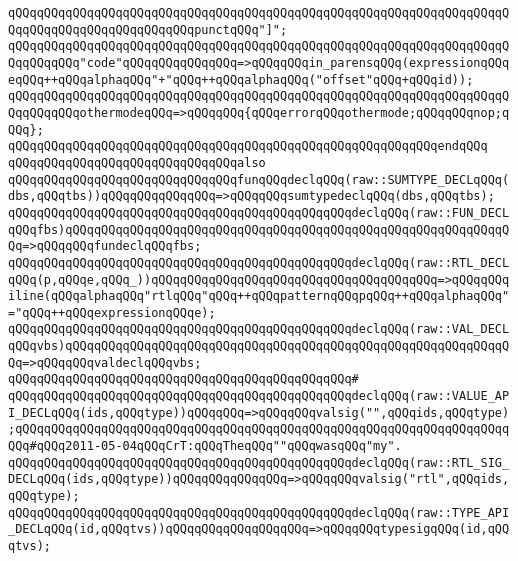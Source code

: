 \verb|qQQqqQQqqQQqqQQqqQQqqQQqqQQqqQQqqQQqqQQqqQQqqQQqqQQqqQQqqQQqqQQqqQQqqQQqqQQqqQQqqQQqqQQqqQQqqQQqpunctqQQq"]";|\newline
\newline
\verb|qQQqqQQqqQQqqQQqqQQqqQQqqQQqqQQqqQQqqQQqqQQqqQQqqQQqqQQqqQQqqQQqqQQqqQQqqQQqqQQq"code"qQQqqQQqqQQqqQQq=>qQQqqQQqin_parensqQQq(expressionqQQqeqQQq++qQQqalphaqQQq"+"qQQq++qQQqalphaqQQq("offset"qQQq+qQQqid));|\newline
\newline
\verb|qQQqqQQqqQQqqQQqqQQqqQQqqQQqqQQqqQQqqQQqqQQqqQQqqQQqqQQqqQQqqQQqqQQqqQQqqQQqqQQqothermodeqQQq=>qQQqqQQq{qQQqerrorqQQqothermode;qQQqqQQqnop;qQQq};|\newline
\verb|qQQqqQQqqQQqqQQqqQQqqQQqqQQqqQQqqQQqqQQqqQQqqQQqqQQqqQQqqQQqendqQQq|\newline
\newline
\verb|qQQqqQQqqQQqqQQqqQQqqQQqqQQqqQQqalso|\newline
\verb|qQQqqQQqqQQqqQQqqQQqqQQqqQQqqQQqfunqQQqdeclqQQq(raw::SUMTYPE_DECLqQQq(dbs,qQQqtbs))qQQqqQQqqQQqqQQq=>qQQqqQQqsumtypedeclqQQq(dbs,qQQqtbs);|\newline
\verb|qQQqqQQqqQQqqQQqqQQqqQQqqQQqqQQqqQQqqQQqqQQqqQQqdeclqQQq(raw::FUN_DECLqQQqfbs)qQQqqQQqqQQqqQQqqQQqqQQqqQQqqQQqqQQqqQQqqQQqqQQqqQQqqQQqqQQqqQQq=>qQQqqQQqfundeclqQQqfbs;|\newline
\verb|qQQqqQQqqQQqqQQqqQQqqQQqqQQqqQQqqQQqqQQqqQQqqQQqdeclqQQq(raw::RTL_DECLqQQq(p,qQQqe,qQQq_))qQQqqQQqqQQqqQQqqQQqqQQqqQQqqQQqqQQqqQQq=>qQQqqQQqiline(qQQqalphaqQQq"rtlqQQq"qQQq++qQQqpatternqQQqpqQQq++qQQqalphaqQQq"="qQQq++qQQqexpressionqQQqe);|\newline
\verb|qQQqqQQqqQQqqQQqqQQqqQQqqQQqqQQqqQQqqQQqqQQqqQQqdeclqQQq(raw::VAL_DECLqQQqvbs)qQQqqQQqqQQqqQQqqQQqqQQqqQQqqQQqqQQqqQQqqQQqqQQqqQQqqQQqqQQqqQQq=>qQQqqQQqvaldeclqQQqvbs;|\newline
\verb|qQQqqQQqqQQqqQQqqQQqqQQqqQQqqQQqqQQqqQQqqQQqqQQq#|\newline
\verb|qQQqqQQqqQQqqQQqqQQqqQQqqQQqqQQqqQQqqQQqqQQqqQQqdeclqQQq(raw::VALUE_API_DECLqQQq(ids,qQQqtype))qQQqqQQq=>qQQqqQQqvalsig("",qQQqids,qQQqtype);qQQqqQQqqQQqqQQqqQQqqQQqqQQqqQQqqQQqqQQqqQQqqQQqqQQqqQQqqQQqqQQqqQQqqQQq#qQQq2011-05-04qQQqCrT:qQQqTheqQQq""qQQqwasqQQq"my".|\newline
\verb|qQQqqQQqqQQqqQQqqQQqqQQqqQQqqQQqqQQqqQQqqQQqqQQqdeclqQQq(raw::RTL_SIG_DECLqQQq(ids,qQQqtype))qQQqqQQqqQQqqQQq=>qQQqqQQqvalsig("rtl",qQQqids,qQQqtype);|\newline
\verb|qQQqqQQqqQQqqQQqqQQqqQQqqQQqqQQqqQQqqQQqqQQqqQQqdeclqQQq(raw::TYPE_API_DECLqQQq(id,qQQqtvs))qQQqqQQqqQQqqQQqqQQq=>qQQqqQQqtypesigqQQq(id,qQQqtvs);|\newline

